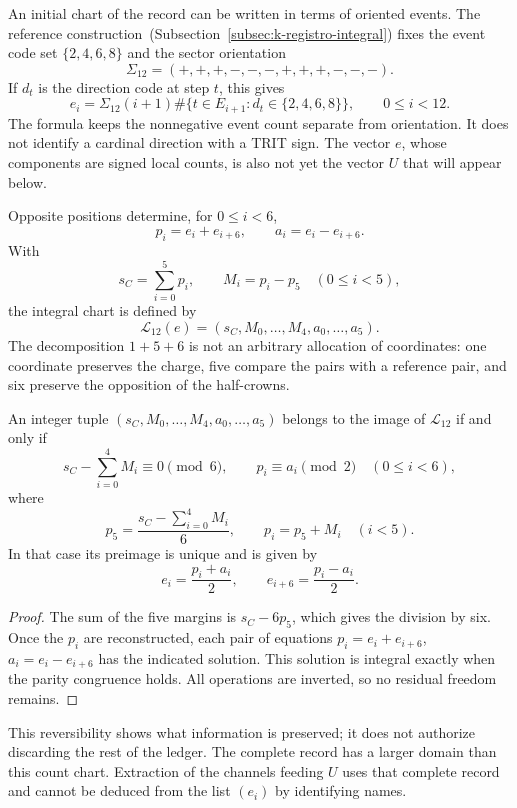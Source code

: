 An initial chart of the record can be written in terms of oriented
events. The reference construction~(Subsection~\ref{subsec:k-registro-integral}) fixes the event code set
\(\{2,4,6,8\}\) and the sector orientation
\[
 \Sigma_{12}=(+,+,+,-,-,-,+,+,+,-,-,-).
\]
If \(d_t\) is the direction code at step \(t\), this gives
\[
 e_i=\Sigma_{12}(i+1)
 \#\{t\in E_{i+1}:d_t\in\{2,4,6,8\}\},
 \qquad0\leq i<12.
\]
The formula keeps the nonnegative event count separate from
orientation. It does not identify a cardinal direction with a TRIT sign. The
vector \(e\), whose components are signed local counts, is also not
yet the vector \(U\) that will appear below.

Opposite positions determine, for \(0\leq i<6\),
\[
 p_i=e_i+e_{i+6},\qquad a_i=e_i-e_{i+6}.
\]
With
\[
 s_C=\sum_{i=0}^{5}p_i,\qquad M_i=p_i-p_5\quad(0\leq i<5),
\]
the integral chart is defined by
\[
 \mathcal L_{12}(e)
 =(s_C,M_0,\ldots,M_4,a_0,\ldots,a_5).
\]
The decomposition \(1+5+6\) is not an arbitrary allocation of coordinates:
one coordinate preserves the charge, five compare the pairs with a
reference pair, and six preserve the opposition of the half-crowns.

\begin{lemma}
\label{lem:k-carta-integral}
An integer tuple \((s_C,M_0,\ldots,M_4,a_0,\ldots,a_5)\) belongs to the
image of \(\mathcal L_{12}\) if and only if
\[
 s_C-\sum_{i=0}^{4}M_i\equiv0\pmod6,
 \qquad p_i\equiv a_i\pmod2\quad(0\leq i<6),
\]
where
\[
 p_5=\frac{s_C-\sum_{i=0}^{4}M_i}{6},\qquad p_i=p_5+M_i\quad(i<5).
\]
In that case its preimage is unique and is given by
\[
 e_i=\frac{p_i+a_i}{2},\qquad e_{i+6}=\frac{p_i-a_i}{2}.
\]
\end{lemma}

\begin{proof}
The sum of the five margins is \(s_C-6p_5\), which gives the
division by six. Once the \(p_i\) are reconstructed, each pair of equations
\(p_i=e_i+e_{i+6}\), \(a_i=e_i-e_{i+6}\) has the indicated solution.
This solution is integral exactly when the parity congruence holds. All
operations are inverted, so no residual freedom remains.
\end{proof}

This reversibility shows what information is preserved; it does not authorize
discarding the rest of the ledger. The complete record has a larger domain
than this count chart. Extraction of the channels feeding
\(U\) uses that complete record and cannot be deduced from the list
\((e_i)\) by identifying names.

